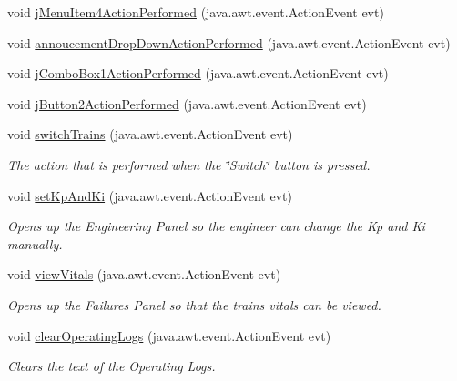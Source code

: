 \begin{DoxyCompactItemize}
\item 
void \hyperlink{classTrainControllerComps_1_1TrainController_aca246fade255ed4452cfffc56aba65c2}{j\+Menu\+Item4\+Action\+Performed} (java.\+awt.\+event.\+Action\+Event evt)
\item 
void \hyperlink{classTrainControllerComps_1_1TrainController_aa9ea2b3c1f1b0aaf9b8f8bd3bd473df9}{annoucement\+Drop\+Down\+Action\+Performed} (java.\+awt.\+event.\+Action\+Event evt)
\item 
void \hyperlink{classTrainControllerComps_1_1TrainController_aabe5156b678079c215181d75ad07a5a3}{j\+Combo\+Box1\+Action\+Performed} (java.\+awt.\+event.\+Action\+Event evt)
\item 
void \hyperlink{classTrainControllerComps_1_1TrainController_a4cf8486cd8da8038fcb71bb1f55d5fa2}{j\+Button2\+Action\+Performed} (java.\+awt.\+event.\+Action\+Event evt)
\item 
void \hyperlink{classTrainControllerComps_1_1TrainController_a8f8abe1e5e4895201707befb39537bfe}{switch\+Trains} (java.\+awt.\+event.\+Action\+Event evt)
\begin{DoxyCompactList}\small\item\em The action that is performed when the \char`\"{}\+Switch\char`\"{} button is pressed. \end{DoxyCompactList}\item 
void \hyperlink{classTrainControllerComps_1_1TrainController_a8b2ce51ec862cda594c72c0b9f7ef3a4}{set\+Kp\+And\+Ki} (java.\+awt.\+event.\+Action\+Event evt)
\begin{DoxyCompactList}\small\item\em Opens up the Engineering Panel so the engineer can change the Kp and Ki manually. \end{DoxyCompactList}\item 
void \hyperlink{classTrainControllerComps_1_1TrainController_ac82b3d9b38e4f9401242eace87b56d97}{view\+Vitals} (java.\+awt.\+event.\+Action\+Event evt)
\begin{DoxyCompactList}\small\item\em Opens up the Failures Panel so that the train\textquotesingle{}s vitals can be viewed. \end{DoxyCompactList}\item 
void \hyperlink{classTrainControllerComps_1_1TrainController_abd14bbac0df7bd4207a2cdf76854802c}{clear\+Operating\+Logs} (java.\+awt.\+event.\+Action\+Event evt)
\begin{DoxyCompactList}\small\item\em Clears the text of the Operating Logs. \end{DoxyCompactList}\item 

\end{DoxyCompactItemize}
